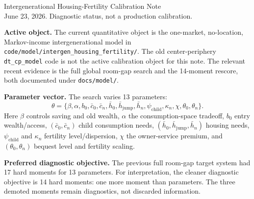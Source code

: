 \documentclass[10pt]{article}
\begin{document}
\begin{center}
{\Large Intergenerational Housing-Fertility Calibration Note}\\
{\normalsize June 23, 2026. Diagnostic status, not a production calibration.}
\end{center}

\textbf{Active object.}
The current quantitative object is the one-market, no-location, Markov-income
intergenerational model in \texttt{code/model/intergen\_housing\_fertility/}.
The old center-periphery \texttt{dt\_cp\_model} code is not the active
calibration object for this note. The relevant recent evidence is the full
global room-gap search and the 14-moment rescore, both documented under
\texttt{docs/model/}.

\textbf{Parameter vector.}
The search varies 13 parameters:
\[
\theta=\{\beta,\alpha,b_0,\bar c_0,\bar c_n,\bar h_0,
\bar h_{\mathrm{jump}},\bar h_n,\psi_{\mathrm{child}},
\kappa_n,\chi,\theta_0,\theta_n\}.
\]
Here \(\beta\) controls saving and old wealth, \(\alpha\) the consumption-space
tradeoff, \(b_0\) entry wealth/access, \((\bar c_0,\bar c_n)\) child consumption
needs, \((\bar h_0,\bar h_{\mathrm{jump}},\bar h_n)\) housing needs,
\(\psi_{\mathrm{child}}\) and \(\kappa_n\) fertility level/dispersion,
\(\chi\) the owner-service premium, and \((\theta_0,\theta_n)\) bequest level
and fertility scaling.

\textbf{Preferred diagnostic objective.}
The previous full room-gap target system had 17 hard moments for 13 parameters.
For interpretation, the cleaner diagnostic objective is 14 hard moments:
one more moment than parameters. The three demoted moments remain diagnostics,
not discarded information.
\end{document}
